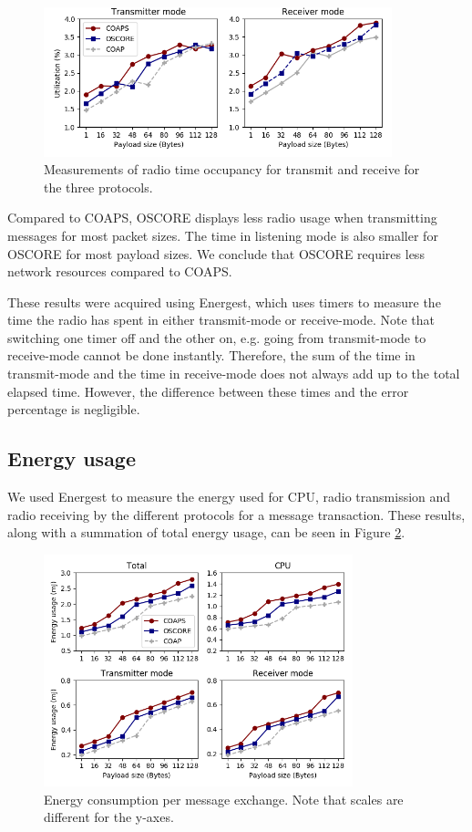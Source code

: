 {\begin{figure}[h]
\centering
\includegraphics[width=0.9\textwidth]{papers/oscore/images/energest-radio.png}
\caption[Radio measurements]{Measurements of radio time occupancy for transmit and receive for the three protocols.}
\label{fig:energest}
\end{figure}

Compared to COAPS, OSCORE displays less radio usage when transmitting messages for most packet sizes. The time in listening mode is also smaller for OSCORE for most payload sizes. We conclude that OSCORE requires less network resources compared to COAPS.

These results were acquired using Energest, which uses timers to measure the time the radio has spent in either transmit-mode or receive-mode. Note that switching one timer off and the other on, e.g. going from transmit-mode to receive-mode cannot be done instantly. Therefore, the sum of the time in transmit-mode and the time in receive-mode does not always add up to the total elapsed time. However, the difference between these times and the error percentage is negligible.

\subsection{Energy usage}
We used Energest to measure the energy used for CPU, radio transmission and radio receiving by the different protocols for a message transaction. These results, along with a summation of total energy usage, can be seen in Figure \ref{fig:energy}.

\begin{figure}[h]
\centering
\includegraphics[width=0.8\textwidth]{papers/oscore/images/energest-energy.png}
\caption[Energy Consumption per exchange]{Energy consumption per message exchange. Note that scales are different for the y-axes.}
\label{fig:energy}
\end{figure}

}
